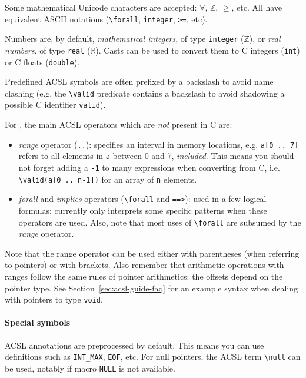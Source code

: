 \documentclass{frama-c-book}
\begin{document}
Some mathematical Unicode characters are accepted:
$\forall$, $\mathbb{Z}$, $\geq$, etc. All have equivalent ASCII notations
(\verb+\forall+, \texttt{integer}, \texttt{>=}, etc).

Numbers are, by default, {\em mathematical integers}, of type \texttt{integer}
(\texttt{$\mathbb{Z}$}), or {\em real numbers}, of type
\texttt{real} (\texttt{$\mathbb{R}$}). Casts can be used to convert them to
C integers (\texttt{int}) or C floats (\texttt{double}).

Predefined ACSL symbols are often prefixed by a backslash to avoid name
clashing (e.g. the \verb+\valid+ predicate contains a
backslash to avoid shadowing a possible C identifier \texttt{valid}).

For \Eva{}, the main ACSL operators which are {\em not} present in C are:

\begin{itemize}
\item {\em range} operator (\texttt{..}): specifies an interval in memory
  locations, e.g. \texttt{a[0 .. 7]} refers to all elements in \texttt{a}
  between 0 and 7, {\em included}. This means you should not forget adding a
  \texttt{-1} to many expressions when converting from C,
  i.e. \verb+\valid(a[0 .. n-1])+ for an array of \texttt{n} elements.
\item {\em forall} and {\em implies} operators (\verb+\forall+
  and \texttt{==>}): used in a few logical formulas; \Eva{} currently only
  interprets some specific patterns when these operators are used.
  Also, note that most uses of \verb+\forall+ are subsumed by the {\em range}
  operator.
\end{itemize}

Note that the range operator can be used either with parentheses
(when referring to pointers) or with brackets. Also remember that arithmetic
operations with ranges follow the same rules of pointer arithmetics:
the offsets depend on the pointer type. See Section~\ref{sec:acsl-guide-faq}
for an example syntax when dealing with pointers to type \texttt{void}.

\paragraph{Special symbols}

ACSL annotations are preprocessed by default. This means you can use
definitions such as \verb+INT_MAX+, \verb+EOF+, etc.
For null pointers, the ACSL term \verb+\null+ can be used, notably if macro
\verb+NULL+ is not available.
\end{document}
